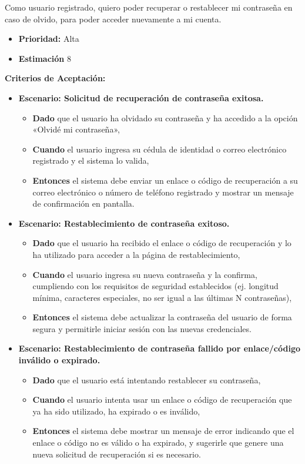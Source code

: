 \documentclass[12pt]{article}
\begin{document}
Como usuario registrado, quiero poder recuperar o restablecer mi contraseña en caso de olvido, para poder acceder nuevamente a mi cuenta.

\begin{itemize}
	\item \textbf{Prioridad:} Alta
	\item \textbf{Estimación} 8
\end{itemize}

\textbf{Criterios de Aceptación:}
\begin{itemize}
	\item \textbf{Escenario: Solicitud de recuperación de contraseña exitosa.}
	\begin{itemize}
		\item \textbf{Dado} que el usuario ha olvidado su contraseña y ha accedido a la opción «Olvidé mi contraseña»,
		\item \textbf{Cuando} el usuario ingresa su cédula de identidad o correo electrónico registrado y el sistema lo valida,
		\item \textbf{Entonces} el sistema debe enviar un enlace o código de recuperación a su correo electrónico o número de teléfono registrado y mostrar un mensaje de confirmación en pantalla.
	\end{itemize}

	\item \textbf{Escenario: Restablecimiento de contraseña exitoso.}
	\begin{itemize}
		\item \textbf{Dado} que el usuario ha recibido el enlace o código de recuperación y lo ha utilizado para acceder a la página de restablecimiento,
		\item \textbf{Cuando} el usuario ingresa su nueva contraseña y la confirma, cumpliendo con los requisitos de seguridad establecidos (ej. longitud mínima, caracteres especiales, no ser igual a las últimas N contraseñas),
		\item \textbf{Entonces} el sistema debe actualizar la contraseña del usuario de forma segura y permitirle iniciar sesión con las nuevas credenciales.
	\end{itemize}

	\item \textbf{Escenario: Restablecimiento de contraseña fallido por enlace/código \\ inválido o expirado.}
	\begin{itemize}
		\item \textbf{Dado} que el usuario está intentando restablecer su contraseña,
		\item \textbf{Cuando} el usuario intenta usar un enlace o código de recuperación que ya ha sido utilizado, ha expirado o es inválido,
		\item \textbf{Entonces} el sistema debe mostrar un mensaje de error indicando que el enlace o código no es válido o ha expirado, y sugerirle que genere una nueva solicitud de recuperación si es necesario.
	\end{itemize}
\end{itemize}
\end{document}

